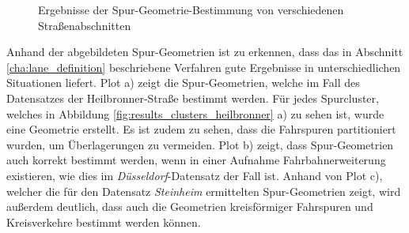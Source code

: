 \begin{figure}
    \centering
    \qquad
    \hfill
    \caption[Ergebnisse der Spur-Geometrie-Bestimmung]
            {Ergebnisse der Spur-Geometrie-Bestimmung von verschiedenen Straßenabschnitten}
    \label{fig:results_laneGeometries}
\end{figure}

Anhand der abgebildeten Spur-Geometrien ist zu erkennen, dass das in Abschnitt \ref{cha:lane_definition}
beschriebene Verfahren gute Ergebnisse in unterschiedlichen Situationen liefert.
Plot a) zeigt die Spur-Geometrien, welche im Fall des Datensatzes der Heilbronner-Straße bestimmt werden.
Für jedes Spurcluster, welches in Abbildung \ref{fig:results_clusters_heilbronner} a) zu sehen ist, wurde eine Geometrie erstellt.
Es ist zudem zu sehen, dass die Fahrspuren partitioniert wurden, um Überlagerungen zu vermeiden.
Plot b) zeigt, dass Spur-Geometrien auch korrekt bestimmt werden, wenn in einer Aufnahme
Fahrbahnerweiterung existieren, wie dies im \textit{Düsseldorf}-Datensatz der Fall ist.
Anhand von Plot c), welcher die für den Datensatz \textit{Steinheim} ermittelten Spur-Geometrien zeigt, wird
außerdem deutlich, dass auch die Geometrien kreisförmiger Fahrspuren und Kreisverkehre bestimmt werden können.

